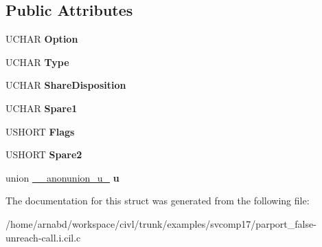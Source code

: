 \subsection*{Public Attributes}
\begin{DoxyCompactItemize}
\item 
\hypertarget{struct__IO__RESOURCE__DESCRIPTOR_ad7a47a5ef57e9fe4db440b206ac1243f}{}U\+C\+H\+A\+R {\bfseries Option}\label{struct__IO__RESOURCE__DESCRIPTOR_ad7a47a5ef57e9fe4db440b206ac1243f}

\item 
\hypertarget{struct__IO__RESOURCE__DESCRIPTOR_ad8e352f006cc2b76e3a4c0d4a952e794}{}U\+C\+H\+A\+R {\bfseries Type}\label{struct__IO__RESOURCE__DESCRIPTOR_ad8e352f006cc2b76e3a4c0d4a952e794}

\item 
\hypertarget{struct__IO__RESOURCE__DESCRIPTOR_ae338f0a86df4deb72ac5d873dba93f5f}{}U\+C\+H\+A\+R {\bfseries Share\+Disposition}\label{struct__IO__RESOURCE__DESCRIPTOR_ae338f0a86df4deb72ac5d873dba93f5f}

\item 
\hypertarget{struct__IO__RESOURCE__DESCRIPTOR_a0526172ec62870c9a02bdb3fc8b82b57}{}U\+C\+H\+A\+R {\bfseries Spare1}\label{struct__IO__RESOURCE__DESCRIPTOR_a0526172ec62870c9a02bdb3fc8b82b57}

\item 
\hypertarget{struct__IO__RESOURCE__DESCRIPTOR_a91efbbc16bee045bdf803eb78299b58d}{}U\+S\+H\+O\+R\+T {\bfseries Flags}\label{struct__IO__RESOURCE__DESCRIPTOR_a91efbbc16bee045bdf803eb78299b58d}

\item 
\hypertarget{struct__IO__RESOURCE__DESCRIPTOR_aa809a7c6b6b3b853e2209f13e01360d8}{}U\+S\+H\+O\+R\+T {\bfseries Spare2}\label{struct__IO__RESOURCE__DESCRIPTOR_aa809a7c6b6b3b853e2209f13e01360d8}

\item 
\hypertarget{struct__IO__RESOURCE__DESCRIPTOR_a7997e503297f899eef1f1e84a37dc988}{}union \hyperlink{union____anonunion__u__24}{\+\_\+\+\_\+anonunion\+\_\+u\+\_} {\bfseries u}\label{struct__IO__RESOURCE__DESCRIPTOR_a7997e503297f899eef1f1e84a37dc988}

\end{DoxyCompactItemize}


The documentation for this struct was generated from the following file\+:\begin{DoxyCompactItemize}
\item 
/home/arnabd/workspace/civl/trunk/examples/svcomp17/parport\+\_\+false-\/unreach-\/call.\+i.\+cil.\+c\end{DoxyCompactItemize}
